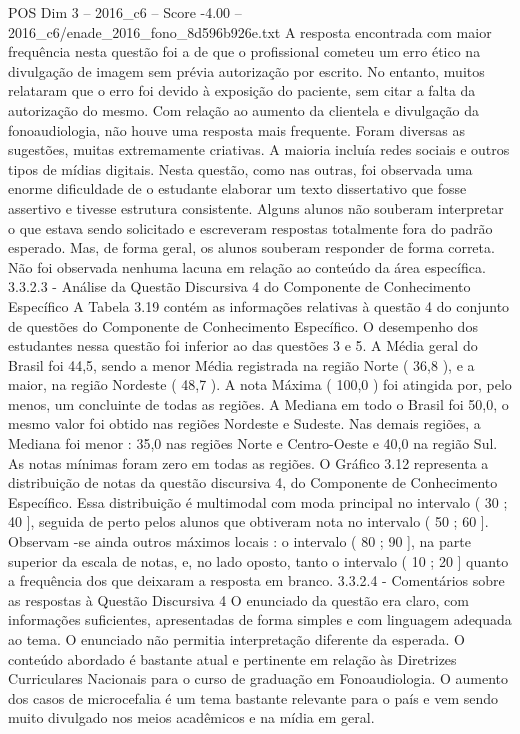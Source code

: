 \begin{textsample}{POS Dim 3 – 2016\_c6 – Score -4.00 – 2016\_c6/enade\_2016\_fono\_8d596b926e.txt}
A resposta encontrada com maior frequência nesta questão foi a de que o profissional cometeu um erro ético na divulgação de imagem sem prévia autorização por escrito.
No entanto, muitos relataram que o erro foi devido à exposição do paciente, sem citar a falta da autorização do mesmo.
Com relação ao aumento da clientela e divulgação da fonoaudiologia, não houve uma resposta mais frequente.
Foram diversas as sugestões, muitas extremamente criativas.
A maioria incluía redes sociais e outros tipos de mídias digitais.
Nesta questão, como nas outras, foi observada uma enorme dificuldade de o estudante elaborar um texto dissertativo que fosse assertivo e tivesse estrutura consistente.
Alguns alunos não souberam interpretar o que estava sendo solicitado e escreveram respostas totalmente fora do padrão esperado.
Mas, de forma geral, os alunos souberam responder de forma correta.
Não foi observada nenhuma lacuna em relação ao conteúdo da área específica. 3.3.2.3 - Análise da Questão Discursiva 4 do Componente de Conhecimento Específico A Tabela 3.19 contém as informações relativas à questão 4 do conjunto de questões do Componente de Conhecimento Específico.
O desempenho dos estudantes nessa questão foi inferior ao das questões 3 e 5.
A Média geral do Brasil foi 44,5, sendo a menor Média registrada na região Norte ( 36,8 ), e a maior, na região Nordeste ( 48,7 ).
A nota Máxima ( 100,0 ) foi atingida por, pelo menos, um concluinte de todas as regiões.
A Mediana em todo o Brasil foi 50,0, o mesmo valor foi obtido nas regiões Nordeste e Sudeste.
Nas demais regiões, a Mediana foi menor : 35,0 nas regiões Norte e Centro-Oeste e 40,0 na região Sul.
As notas mínimas foram zero em todas as regiões.
O Gráfico 3.12 representa a distribuição de notas da questão discursiva 4, do Componente de Conhecimento Específico.
Essa distribuição é multimodal com moda principal no intervalo ( 30 ; 40 ], seguida de perto pelos alunos que obtiveram nota no intervalo ( 50 ; 60 ].
Observam -se ainda outros máximos locais : o intervalo ( 80 ; 90 ], na parte superior da escala de notas, e, no lado oposto, tanto o intervalo ( 10 ; 20 ] quanto a frequência dos que deixaram a resposta em branco. 3.3.2.4 - Comentários sobre as respostas à Questão Discursiva 4 O enunciado da questão era claro, com informações suficientes, apresentadas de forma simples e com linguagem adequada ao tema.
O enunciado não permitia interpretação diferente da esperada.
O conteúdo abordado é bastante atual e pertinente em relação às Diretrizes Curriculares Nacionais para o curso de graduação em Fonoaudiologia.
O aumento dos casos de microcefalia é um tema bastante relevante para o país e vem sendo muito divulgado nos meios acadêmicos e na mídia em geral.

\end{textsample}
